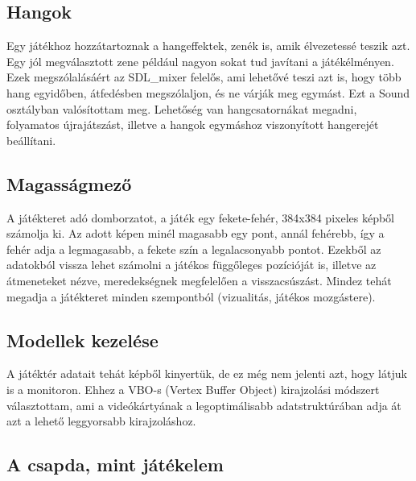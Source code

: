 \subsection{Hangok}


Egy játékhoz hozzátartoznak a hangeffektek, zenék is, amik élvezetessé teszik azt. Egy jól megválasztott zene például nagyon sokat tud javítani a játékélményen. Ezek megszólalásáért az SDL\_mixer felelős, ami lehetővé teszi azt is, hogy több hang egyidőben, átfedésben megszólaljon, és ne várják meg egymást. Ezt a Sound osztályban valósítottam meg. Lehetőség van hangcsatornákat megadni, folyamatos újrajátszást, illetve a hangok egymáshoz viszonyított hangerejét beállítani.

\subsection{Magasságmező}


A játékteret adó domborzatot, a játék egy fekete-fehér, 384x384 pixeles képből számolja ki. Az adott képen minél magasabb egy pont, annál fehérebb, így a fehér adja a legmagasabb, a fekete szín a legalacsonyabb pontot. Ezekből az adatokból vissza lehet számolni a játékos függőleges pozícióját is, illetve az átmeneteket nézve, meredekségnek megfelelően a visszacsúszást. Mindez tehát megadja a játékteret minden szempontból (vizualitás, játékos mozgástere).

\subsection{Modellek kezelése}


A játéktér adatait tehát képből kinyertük, de ez még nem jelenti azt, hogy látjuk is a monitoron. Ehhez a VBO-s (Vertex Buffer Object) kirajzolási módszert választottam, ami a videókártyának a legoptimálisabb adatstruktúrában adja át azt a lehető leggyorsabb kirajzoláshoz.

\subsection{A csapda, mint játékelem}


